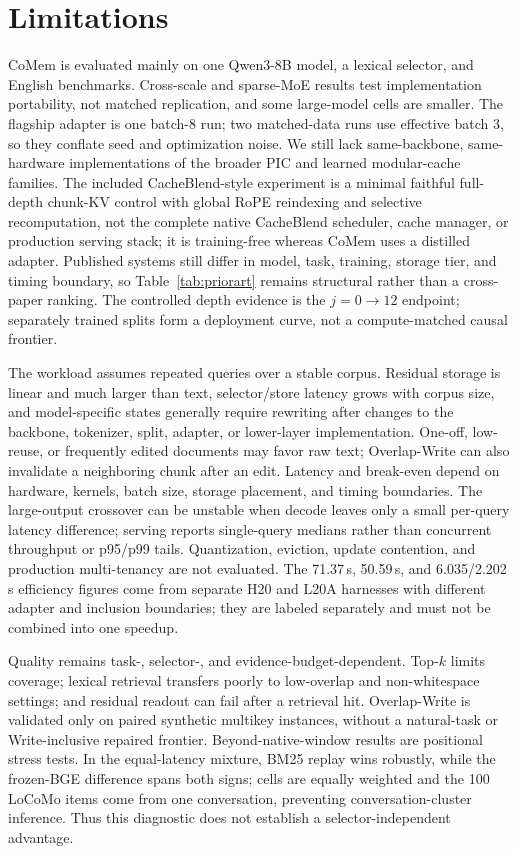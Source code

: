 \section*{Limitations}

CoMem is evaluated mainly on one Qwen3-8B model, a lexical selector, and English
benchmarks. Cross-scale and sparse-MoE results test implementation portability,
not matched replication, and some large-model cells are smaller. The flagship
adapter is one batch-8 run; two matched-data runs use effective batch 3, so they
conflate seed and optimization noise. We still lack same-backbone,
same-hardware implementations of the broader PIC and learned modular-cache
families. The included CacheBlend-style experiment is a minimal faithful
full-depth chunk-KV control with global RoPE reindexing and selective
recomputation, not the complete native CacheBlend scheduler, cache manager, or
production serving stack; it is training-free whereas CoMem uses a distilled
adapter. Published systems still differ in model, task, training, storage tier,
and timing boundary, so Table~\ref{tab:priorart} remains structural rather than
a cross-paper ranking. The controlled depth evidence is the
$j{=}0\!\rightarrow\!12$ endpoint; separately trained splits form a deployment
curve, not a compute-matched causal frontier.

The workload assumes repeated queries over a stable corpus. Residual storage is
linear and much larger than text, selector/store latency grows with corpus size,
and model-specific states generally require rewriting after changes to the
backbone, tokenizer, split, adapter, or lower-layer implementation. One-off,
low-reuse, or frequently edited documents may favor raw text; Overlap-Write can
also invalidate a neighboring chunk after an edit. Latency and break-even depend
on hardware, kernels, batch size, storage placement, and timing boundaries. The
large-output crossover can be unstable when decode leaves only a small
per-query latency difference; serving reports single-query medians rather than
concurrent throughput or p95/p99 tails. Quantization,
eviction, update contention, and production multi-tenancy are not evaluated.
The 71.37\,s, 50.59\,s, and 6.035/2.202\,s efficiency figures come from
separate H20 and L20A harnesses with different adapter and inclusion boundaries;
they are labeled separately and must not be combined into one speedup.

Quality remains task-, selector-, and evidence-budget-dependent. Top-$k$ limits
coverage; lexical retrieval transfers poorly to low-overlap and non-whitespace
settings; and residual readout can fail after a retrieval hit. Overlap-Write is
validated only on paired synthetic multikey instances, without a natural-task or
Write-inclusive repaired frontier. Beyond-native-window results are positional
stress tests. In the equal-latency mixture, BM25 replay wins robustly, while the
frozen-BGE difference spans both signs; cells are equally weighted and the 100
LoCoMo items come from one conversation, preventing conversation-cluster
inference. Thus this diagnostic does not establish a selector-independent
advantage.

